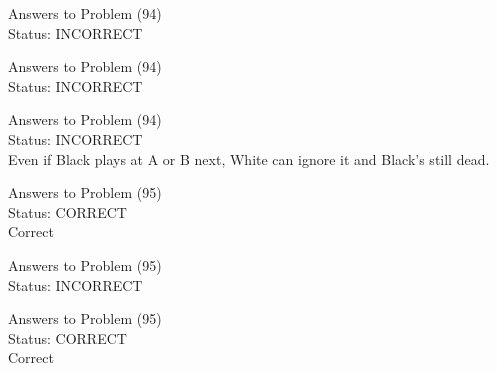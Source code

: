 \documentclass[11pt]{article}
\begin{document}
\begin{minipage}[t]{0.5\textwidth}
  {\centering
  
  Answers to Problem (94)\\
  Status: INCORRECT\\
  
  }
\end{minipage}
\begin{minipage}[t]{0.5\textwidth}
  {\centering
  
  Answers to Problem (94)\\
  Status: INCORRECT\\
  
  }
\end{minipage}
\begin{minipage}[t]{0.5\textwidth}
  {\centering
  
  Answers to Problem (94)\\
  Status: INCORRECT\\
  Even if Black plays at A or B next, White can ignore it and Black's still dead.\\
  }
\end{minipage}
\begin{minipage}[t]{0.5\textwidth}
  {\centering
  
  Answers to Problem (95)\\
  Status: CORRECT\\
  Correct\\
  }
\end{minipage}
\begin{minipage}[t]{0.5\textwidth}
  {\centering
  
  Answers to Problem (95)\\
  Status: INCORRECT\\
  
  }
\end{minipage}
\begin{minipage}[t]{0.5\textwidth}
  {\centering
  
  Answers to Problem (95)\\
  Status: CORRECT\\
  Correct\\
  }
\end{minipage}
\end{document}
